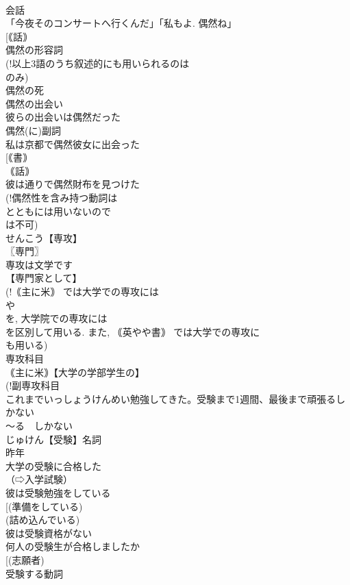 \documentclass[8pt]{extreport}
\begin{document}
\begin{CJK}{UTF8}{min}
\\	会話
\\	「今夜そのコンサートへ行くんだ」「私もよ. 偶然ね」
\\	[｟話｠ 
\\	偶然の形容詞
\\	(!以上3語のうち叙述的にも用いられるのは 
\\	のみ)
\\	偶然の死
\\	偶然の出会い
\\	彼らの出会いは偶然だった
\\	偶然(に)副詞
\\	私は京都で偶然彼女に出会った
\\	[｟書｠ 
\\	｟話｠
\\	彼は通りで偶然財布を見つけた
\\	(!偶然性を含み持つ動詞は 
\\	とともには用いないので 
\\	は不可)
\\	せんこう【専攻】
\\	〖専門〗
\\	専攻は文学です
\\	【専門家として】
\\	(!｟主に米｠ では大学での専攻には 
\\	や 
\\	を, 大学院での専攻には 
\\	を区別して用いる. また, ｟英やや書｠ では大学での専攻に 
\\	も用いる)
\\	専攻科目
\\	｟主に米｠【大学の学部学生の】
\\	(!副専攻科目 
\\	これまでいっしょうけんめい勉強してきた。受験まで1週間、最後まで頑張るしかない
\\	〜る　しかない　
\\	じゅけん【受験】名詞
\\	昨年
\\	大学の受験に合格した
\\	（⇨入学試験）
\\	彼は受験勉強をしている
\\	[(準備をしている) 
\\	(詰め込んでいる) 
\\	彼は受験資格がない
\\	何人の受験生が合格しましたか
\\	[(志願者) 
\\	受験する動詞

\end{CJK}
\end{document}
